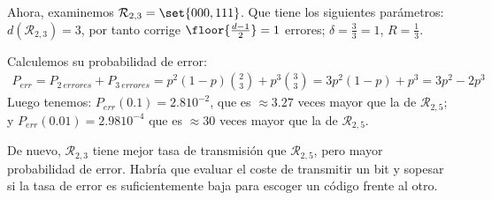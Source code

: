 \begin{problem}[10]
Ahora, examinemos $\mathcal{R}_{2,3} = \set{000,111}$. Que tiene los siguientes parámetros: ${d(\mathcal{R}_{2,3}) = 3}$, por tanto corrige $\floor{\frac{d-1}{2}} = 1$ errores; $\delta = \frac{3}{3} = 1$, $R = \frac{1}{3}$.

Calculemos su probabilidad de error:
\begin{align*}
P_{err} = P_{2\ errores} + P_{3\ errores} = p^2 (1-p) {{2}\choose{3}} + p^3 {{3}\choose{3}} =3 p^2 (1-p) + p^3 = 3p^2 - 2p^3
\end{align*}
Luego tenemos: $P_{err}(0.1) = 2.8 {10}^{-2}$, que es $\approx 3.27$ veces mayor que la de $\mathcal{R}_{2,5}$; y $P_{err}(0.01) = 2.98 {10}^{-4}$ que es $\approx 30$ veces mayor que la de $\mathcal{R}_{2,5}$.

De nuevo, $\mathcal{R}_{2,3}$ tiene mejor tasa de transmisión que $\mathcal{R}_{2,5}$, pero mayor probabilidad de error. Habría que evaluar el coste de transmitir un bit y sopesar si la tasa de error es suficientemente baja para escoger un código frente al otro.


\end{problem}

